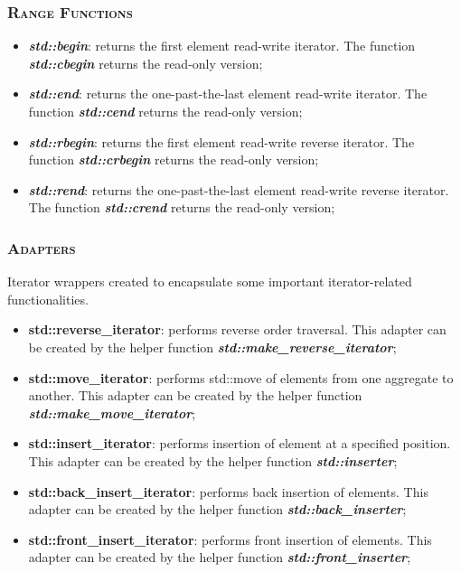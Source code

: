 \documentclass[10pt]{article}
\begin{document}
\begin{multicols*}{5}
{\subsubsection*{\textsc{Range Functions}} 
\begin{itemize}[leftmargin=*,topsep=0.25pt]
  \setlength\itemsep{.3pt}
	\item  \emph{\textbf{std::begin}}: returns the first element read-write iterator. The function \emph{\textbf{std::cbegin}} returns the read-only version;
	\item  \emph{\textbf{std::end}}: returns the one-past-the-last element read-write iterator. The function \emph{\textbf{std::cend}} returns the read-only version;
	\item  \emph{\textbf{std::rbegin}}: returns the first element read-write reverse iterator. The function \emph{\textbf{std::crbegin}} returns the read-only version;
	\item  \emph{\textbf{std::rend}}: returns the one-past-the-last element read-write reverse iterator. The function \emph{\textbf{std::crend}} returns the read-only version;
\end{itemize}

\subsubsection*{\textsc{Adapters}} 
\noindent
Iterator wrappers created to encapsulate some important iterator-related functionalities. 
\begin{itemize}[leftmargin=*,topsep=0.25pt]
  \setlength\itemsep{.3pt}
	\item \textbf{std::reverse\_iterator}: performs reverse order traversal. This adapter can be created by the helper function \emph{\textbf{std::make\_reverse\_iterator}};
	\item \textbf{std::move\_iterator}: performs std::move of elements from one aggregate to another. This adapter can be created by the helper function \emph{\textbf{std::make\_move\_iterator}};
	\item \textbf{std::insert\_iterator}: performs insertion of element at a specified position. This adapter can be created by the helper function \emph{\textbf{std::inserter}};
	\item \textbf{std::back\_insert\_iterator}: performs back insertion of elements. This adapter can be created by the helper function \emph{\textbf{std::back\_inserter}};
	\item \textbf{std::front\_insert\_iterator}: performs front insertion of elements. This adapter can be created by the helper function \emph{\textbf{std::front\_inserter}};
\end{itemize}


}
\end{multicols*}
\end{document}
